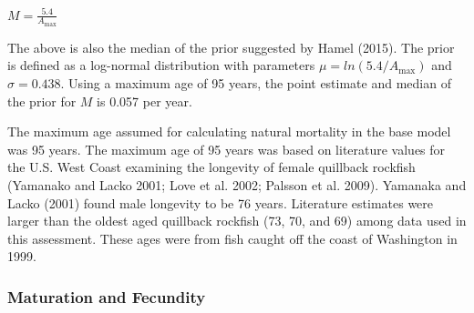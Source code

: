 \documentclass[11pt,
  english,
  letterpaper,
]{article}
\begin{document}
\leavevmode\tagmcend\tagstructend\par

\begin{centering}

$M=\frac{5.4}{A_{\text{max}}}$

\end{centering}


The above is also the median of the prior suggested by Hamel {(2015)\leavevmode\tagmcend\tagstructend}. The prior is defined as a log-normal distribution with parameters {\(\mu = ln(5.4/A_{\text{max}})\)\leavevmode\tagmcend\tagstructend} and {\(\sigma = 0.438\)\leavevmode\tagmcend\tagstructend}. Using a maximum age of 95 years, the point estimate and median of the prior for {\(M\)\leavevmode\tagmcend\tagstructend} is 0.057 per year.

\leavevmode\tagmcend\tagstructend\par


The maximum age assumed for calculating natural mortality in the base model was 95 years. The maximum age of 95 years was based on literature values for the U.S. West Coast examining the longevity of female quillback rockfish {(Yamanako and Lacko 2001; Love et al. 2002; Palsson et al. 2009)\leavevmode\tagmcend\tagstructend}. Yamanaka and Lacko {(2001)\leavevmode\tagmcend\tagstructend} found male longevity to be 76 years. Literature estimates were larger than the oldest aged quillback rockfish (73, 70, and 69) among data used in this assessment. These ages were from fish caught off the coast of Washington in 1999.

\leavevmode\tagmcend\tagstructend\par


\hypertarget{maturation-and-fecundity}{%
\subsubsection{Maturation and Fecundity}\label{maturation-and-fecundity}}
\end{document}
